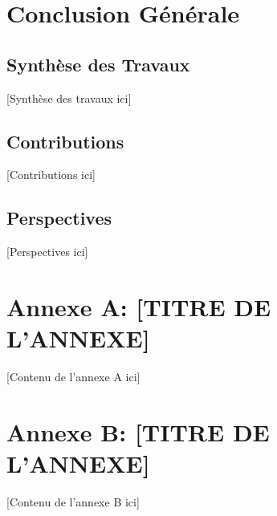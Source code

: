 \documentclass[12pt,a4paper]{report}
\begin{document}







\chapter{Conclusion Générale}
\section{Synthèse des Travaux}
[Synthèse des travaux ici]

\section{Contributions}
[Contributions ici]

\section{Perspectives}
[Perspectives ici]




\begin{appendices}
\chapter{Annexe A: [TITRE DE L'ANNEXE]}
[Contenu de l'annexe A ici]

\chapter{Annexe B: [TITRE DE L'ANNEXE]}
[Contenu de l'annexe B ici]
\end{appendices}
\end{document}

